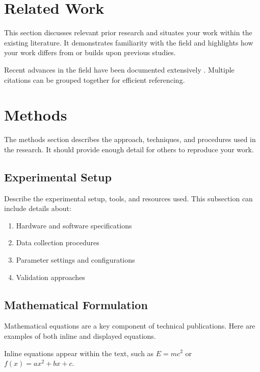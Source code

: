 \documentclass[12pt,a4paper]{article}
\begin{document}
\section{Related Work}
\label{sec:related}

This section discusses relevant prior research and situates your work within the existing literature. It demonstrates familiarity with the field and highlights how your work differs from or builds upon previous studies.

Recent advances in the field have been documented extensively \cite{goossens1994latex}. Multiple citations can be grouped together \cite{knuth1984texbook,lamport1994latex,goossens1994latex} for efficient referencing.

\section{Methods}
\label{sec:methods}

The methods section describes the approach, techniques, and procedures used in the research. It should provide enough detail for others to reproduce your work.

\subsection{Experimental Setup}
\label{subsec:setup}

Describe the experimental setup, tools, and resources used. This subsection can include details about:
\begin{enumerate}
    \item Hardware and software specifications
    \item Data collection procedures
    \item Parameter settings and configurations
    \item Validation approaches
\end{enumerate}

\subsection{Mathematical Formulation}
\label{subsec:math}

Mathematical equations are a key component of technical publications. Here are examples of both inline and displayed equations.

Inline equations appear within the text, such as $E = mc^2$ or $f(x) = ax^2 + bx + c$.
\end{document}
